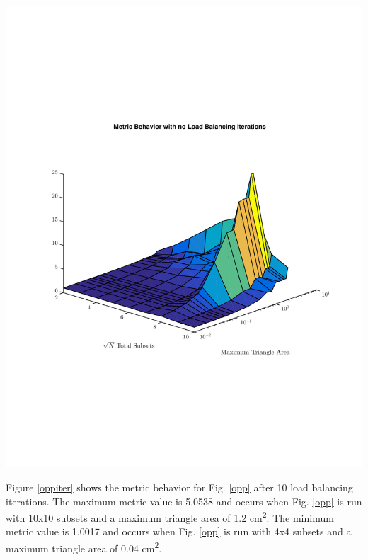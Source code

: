 \noindent\begin{minipage}{\textwidth}
\centering
\includegraphics[scale=0.75, trim = 0cm 8cm 0cm 7cm,clip]{figures/OppNoIter.pdf}
\label{oppnoiter}
\end{minipage}
\smallskip

Figure \ref{oppiter} shows the metric behavior for Fig. \ref{opp} after 10 load balancing iterations. The maximum metric value is 5.0538 and occurs when Fig. \ref{opp} is run with 10x10 subsets and a maximum triangle area of 1.2 cm\textsuperscript{2}. The minimum metric value is 1.0017 and occurs when Fig. \ref{opp} is run with 4x4 subsets and a maximum triangle area of 0.04 cm\textsuperscript{2}.

